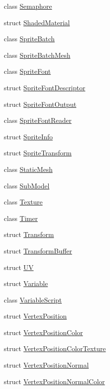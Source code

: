 \begin{DoxyCompactItemize}
class \hyperlink{classmage_1_1_semaphore}{Semaphore}
\item 
struct \hyperlink{structmage_1_1_shaded_material}{Shaded\+Material}
\item 
class \hyperlink{classmage_1_1_sprite_batch}{Sprite\+Batch}
\item 
class \hyperlink{classmage_1_1_sprite_batch_mesh}{Sprite\+Batch\+Mesh}
\item 
class \hyperlink{classmage_1_1_sprite_font}{Sprite\+Font}
\item 
struct \hyperlink{structmage_1_1_sprite_font_descriptor}{Sprite\+Font\+Descriptor}
\item 
struct \hyperlink{structmage_1_1_sprite_font_output}{Sprite\+Font\+Output}
\item 
class \hyperlink{classmage_1_1_sprite_font_reader}{Sprite\+Font\+Reader}
\item 
struct \hyperlink{structmage_1_1_sprite_info}{Sprite\+Info}
\item 
struct \hyperlink{structmage_1_1_sprite_transform}{Sprite\+Transform}
\item 
class \hyperlink{classmage_1_1_static_mesh}{Static\+Mesh}
\item 
class \hyperlink{classmage_1_1_sub_model}{Sub\+Model}
\item 
class \hyperlink{classmage_1_1_texture}{Texture}
\item 
class \hyperlink{classmage_1_1_timer}{Timer}
\item 
struct \hyperlink{structmage_1_1_transform}{Transform}
\item 
struct \hyperlink{structmage_1_1_transform_buffer}{Transform\+Buffer}
\item 
struct \hyperlink{structmage_1_1_u_v}{UV}
\item 
struct \hyperlink{structmage_1_1_variable}{Variable}
\item 
class \hyperlink{classmage_1_1_variable_script}{Variable\+Script}
\item 
struct \hyperlink{structmage_1_1_vertex_position}{Vertex\+Position}
\item 
struct \hyperlink{structmage_1_1_vertex_position_color}{Vertex\+Position\+Color}
\item 
struct \hyperlink{structmage_1_1_vertex_position_color_texture}{Vertex\+Position\+Color\+Texture}
\item 
struct \hyperlink{structmage_1_1_vertex_position_normal}{Vertex\+Position\+Normal}
\item 
struct \hyperlink{structmage_1_1_vertex_position_normal_color}{Vertex\+Position\+Normal\+Color}

\end{DoxyCompactItemize}
